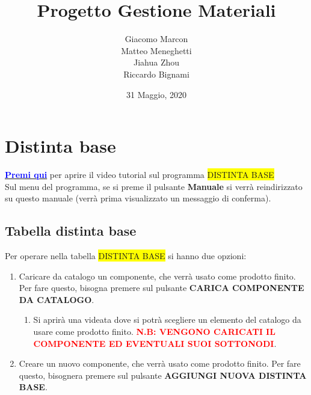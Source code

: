 \documentclass[12pt,twoside]{report}
\newcommand{\coloredbold}[2]{\textcolor{#1}{\textbf{#2}}}
\begin{document}
\title{Progetto Gestione Materiali}
\author
{
	Giacomo Marcon
	\\ Matteo Meneghetti  
	\\ Jiahua Zhou
	\\ Riccardo Bignami
}
\date{31 Maggio, 2020}
\maketitle

\newpage
\tableofcontents{}  

\chapter{Distinta base}   

\href{https://drive.google.com/file/d/1uhCLJQT8CLmh1zFzK5Ff-jDEkEGrC3Ny/view?usp=sharing}{\coloredbold{blue}{Premi qui}} per aprire il video tutorial sul programma \colorbox{yellow}{DISTINTA BASE}\\

Sul menu del programma, se si preme il pulsante \textbf{Manuale} si verrà reindirizzato su questo manuale (verrà prima visualizzato un messaggio di conferma).


\section{Tabella distinta base}

Per operare nella tabella \colorbox{yellow}{DISTINTA BASE} si hanno due opzioni: 

\begin{enumerate}
	
	\item Caricare da catalogo un componente, che verrà usato come prodotto finito. Per fare questo, bisogna premere sul pulsante \textbf{CARICA COMPONENTE DA CATALOGO}.
	      	
	      \begin{enumerate}
	      	
	      	\item Si aprirà una videata dove si potrà scegliere un elemento del catalogo da usare come prodotto finito.
	      	      \coloredbold{red}{N.B: VENGONO CARICATI IL COMPONENTE ED EVENTUALI SUOI SOTTONODI}.
	      	      
	      \end{enumerate}
	      
	\item Creare un nuovo componente, che verrà usato come prodotto finito. Per fare questo, bisognera premere sul pulsante \textbf{AGGIUNGI NUOVA DISTINTA BASE}.
	      	
\end{enumerate}
\end{document}
